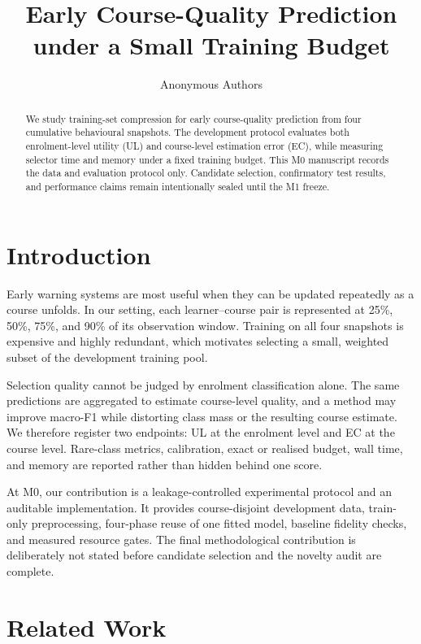\documentclass[runningheads]{llncs}
\title{Early Course-Quality Prediction under a Small Training Budget}
\author{Anonymous Authors}
\institute{Anonymous Institution}
\begin{document}
\maketitle

\begin{abstract}
We study training-set compression for early course-quality prediction from four
cumulative behavioural snapshots.  The development protocol evaluates both
enrolment-level utility (UL) and course-level estimation error (EC), while
measuring selector time and memory under a fixed training budget.  This M0
manuscript records the data and evaluation protocol only.  Candidate selection,
confirmatory test results, and performance claims remain intentionally sealed
until the M1 freeze.
\end{abstract}

\section{Introduction}
Early warning systems are most useful when they can be updated repeatedly as a
course unfolds.  In our setting, each learner--course pair is represented at
25\%, 50\%, 75\%, and 90\% of its observation window.  Training on all four
snapshots is expensive and highly redundant, which motivates selecting a small,
weighted subset of the development training pool.

Selection quality cannot be judged by enrolment classification alone.  The
same predictions are aggregated to estimate course-level quality, and a method
may improve macro-F1 while distorting class mass or the resulting course
estimate.  We therefore register two endpoints: UL at the enrolment level and
EC at the course level.  Rare-class metrics, calibration, exact or realised
budget, wall time, and memory are reported rather than hidden behind one score.

At M0, our contribution is a leakage-controlled experimental protocol and an
auditable implementation.  It provides course-disjoint development data,
train-only preprocessing, four-phase reuse of one fitted model, baseline
fidelity checks, and measured resource gates.  The final methodological
contribution is deliberately not stated before candidate selection and the
novelty audit are complete.

\section{Related Work}
\end{document}
